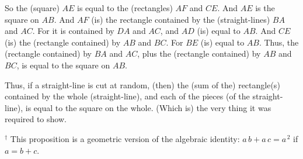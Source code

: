 \begin{Parallel}{}{}
{So the (square) $AE$ is equal to the (rectangles) $AF$ and $CE$. And $AE$ is the square on $AB$.  And $AF$ (is) the rectangle contained by the (straight-lines) $BA$ and $AC$. For it is contained by $DA$ and $AC$, and $AD$ (is) equal to $AB$. 
And $CE$ (is) the (rectangle contained) by $AB$ and $BC$. For $BE$ (is) equal
to $AB$. Thus, the (rectangle contained) by $BA$ and $AC$, plus the
(rectangle contained) by $AB$ and $BC$, is equal to the square on $AB$.

Thus, if a straight-line is cut at random,  (then) the (sum of the) rectangle(s) contained by the whole
(straight-line), and each of the pieces (of the straight-line), is equal to the square on the whole. (Which is) the very thing it was required to show.}
\end{Parallel}
{\footnotesize \noindent$^\dag$ This proposition is a geometric version
of the algebraic identity: $a\,b+a\,c=a^{\,2}$ if $a=b+c$.}

